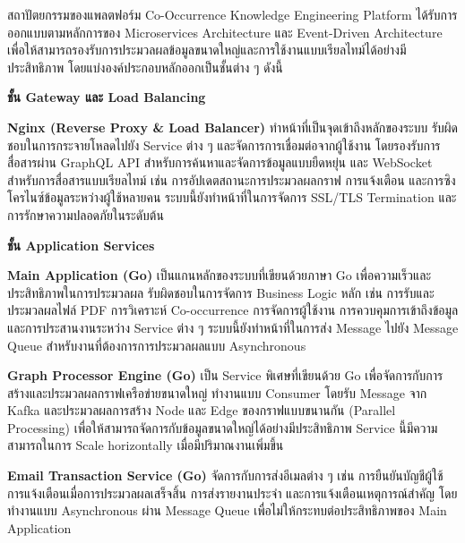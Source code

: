 \documentclass[12pt,a4paper]{article}
\newcommand{\textlight}[1]{{\thailightfont #1}}
\begin{document}
\begin{enumerate}[leftmargin=2cm]
\begin{enumerate}
        \textlight{
            \hspace{1cm}สถาปัตยกรรมของแพลตฟอร์ม Co-Occurrence Knowledge Engineering Platform ได้รับการออกแบบตามหลักการของ Microservices Architecture และ Event-Driven Architecture เพื่อให้สามารถรองรับการประมวลผลข้อมูลขนาดใหญ่และการใช้งานแบบเรียลไทม์ได้อย่างมีประสิทธิภาพ โดยแบ่งองค์ประกอบหลักออกเป็นชั้นต่าง ๆ ดังนี้

            \vspace{0.5cm}

            \textbf{ชั้น Gateway และ Load Balancing}

            \hspace{1cm}\textbf{Nginx (Reverse Proxy \& Load Balancer)} ทำหน้าที่เป็นจุดเข้าถึงหลักของระบบ รับผิดชอบในการกระจายโหลดไปยัง Service ต่าง ๆ และจัดการการเชื่อมต่อจากผู้ใช้งาน โดยรองรับการสื่อสารผ่าน GraphQL API สำหรับการค้นหาและจัดการข้อมูลแบบยืดหยุ่น และ WebSocket สำหรับการสื่อสารแบบเรียลไทม์ เช่น การอัปเดตสถานะการประมวลผลกราฟ การแจ้งเตือน และการซิงโครไนซ์ข้อมูลระหว่างผู้ใช้หลายคน ระบบนี้ยังทำหน้าที่ในการจัดการ SSL/TLS Termination และการรักษาความปลอดภัยในระดับต้น

            \vspace{3.5cm}

            \textbf{ชั้น Application Services}

            \hspace{1cm}\textbf{Main Application (Go)} เป็นแกนหลักของระบบที่เขียนด้วยภาษา Go เพื่อความเร็วและประสิทธิภาพในการประมวลผล รับผิดชอบในการจัดการ Business Logic หลัก เช่น การรับและประมวลผลไฟล์ PDF การวิเคราะห์ Co-occurrence การจัดการผู้ใช้งาน การควบคุมการเข้าถึงข้อมูล และการประสานงานระหว่าง Service ต่าง ๆ ระบบนี้ยังทำหน้าที่ในการส่ง Message ไปยัง Message Queue สำหรับงานที่ต้องการการประมวลผลแบบ Asynchronous

            \hspace{1cm}\textbf{Graph Processor Engine (Go)} เป็น Service พิเศษที่เขียนด้วย Go เพื่อจัดการกับการสร้างและประมวลผลกราฟเครือข่ายขนาดใหญ่ ทำงานแบบ Consumer โดยรับ Message จาก Kafka และประมวลผลการสร้าง Node และ Edge ของกราฟแบบขนานกัน (Parallel Processing) เพื่อให้สามารถจัดการกับข้อมูลขนาดใหญ่ได้อย่างมีประสิทธิภาพ Service นี้มีความสามารถในการ Scale horizontally เมื่อมีปริมาณงานเพิ่มขึ้น

            \hspace{1cm}\textbf{Email Transaction Service (Go)} จัดการกับการส่งอีเมลต่าง ๆ เช่น การยืนยันบัญชีผู้ใช้ การแจ้งเตือนเมื่อการประมวลผลเสร็จสิ้น การส่งรายงานประจำ และการแจ้งเตือนเหตุการณ์สำคัญ โดยทำงานแบบ Asynchronous ผ่าน Message Queue เพื่อไม่ให้กระทบต่อประสิทธิภาพของ Main Application

}
\end{enumerate}
\end{enumerate}
\end{document}
